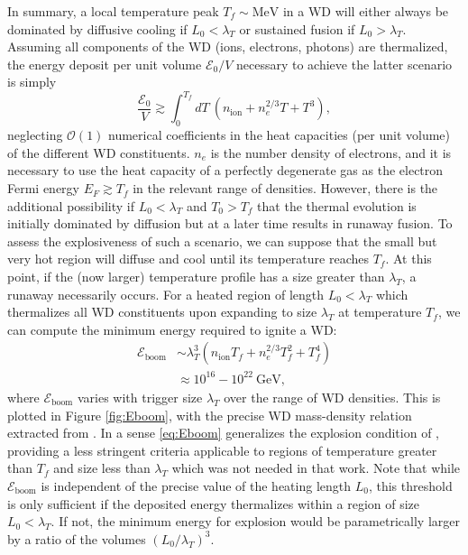 \documentclass[twocolumn,preprintnumbers,amsmath,amssymb,prl, superscriptaddress]{revtex4}
\newcommand{\Ez}{\mathcal{E}_0}
\newcommand{\Eboom}{\mathcal{E}_\text{boom}}
\newcommand{\OO}{\mathcal{O}}
\newcommand{\GeV}{\text{GeV}}
\newcommand{\MeV}{\text{MeV}}
\begin{document}
In summary, a local temperature peak $T_f \sim \MeV$ in a WD will either always be dominated by diffusive cooling if $L_0 < \lambda_T$ or sustained fusion if $L_0 > \lambda_T$.
Assuming all components of the WD (ions, electrons, photons) are thermalized, the energy deposit per unit volume $\Ez/V$ necessary to achieve the latter scenario is simply 
\begin{equation}
\label{eq:boom}
  \frac{\Ez}{V} \gtrsim \int_0^{T_f} dT ~(n_\text{ion} + n_e^{2/3} T + T^3),
\end{equation}
neglecting $\OO(1)$ numerical coefficients in the heat capacities (per unit volume) of the different WD constituents. 
$n_e$ is the number density of electrons, and it is necessary to use the heat capacity of a perfectly degenerate gas as the electron Fermi energy $E_F \gtrsim T_f$ in the relevant range of densities.
However, there is the additional possibility if $L_0 < \lambda_T$ and $T_0 > T_f$ that the thermal evolution is initially dominated by diffusion but at a later time results in runaway fusion.
To assess the explosiveness of such a scenario, we can suppose that the small but very hot region will diffuse and cool until its temperature reaches $T_f$.
At this point, if the (now larger) temperature profile has a size greater than $\lambda_T$, a runaway necessarily occurs. 
For a heated region of length $L_0 < \lambda_T$ which thermalizes all WD constituents upon expanding to size $\lambda_T$ at temperature $T_f$, we can compute the minimum energy required to ignite a WD:
\begin{align}
\label{eq:Eboom}
\Eboom &\sim \lambda_T^3 (n_\text{ion} T_f + n_e^{2/3} T_f^2 + T_f^4) \\  
	     &\approx 10^{16} - 10^{22} ~\GeV \nonumber,
\end{align}
where $\Eboom$ varies with trigger size $\lambda_T$ over the range of WD densities.
This is plotted in Figure \ref{fig:Eboom}, with the precise WD mass-density relation extracted from \cite{cococubed}. 
In a sense \eqref{eq:Eboom} generalizes the explosion condition of \cite{Graham:2015apa}, providing a less stringent criteria applicable to regions of temperature greater than $T_f$ and size less than $\lambda_T$ which was not needed in that work.
Note that while $\Eboom$ is independent of the precise value of the heating length $L_0$, this threshold is only sufficient if the deposited energy thermalizes within a region of size $L_0 < \lambda_T$.
If not, the minimum energy for explosion would be parametrically larger by a ratio of the volumes $(L_0/\lambda_T)^3$.
\end{document}
